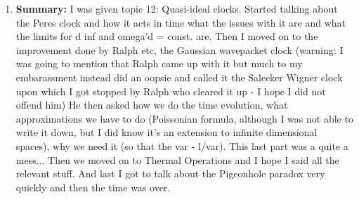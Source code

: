 \documentclass{article}%
\begin{document}
\begin{enumerate}
\item%
\begin{mycolorbox}%
\textbf{Summary:}%
\newline%
I was given topic 12: Quasi{-}ideal clocks. Started talking about the Peres clock and how it acts in time what the issues with it are and what the limits for d inf and omega'd = const. are. Then I moved on to the improvement done by Ralph etc, the Gaussian wavepacket clock (warning: I was going to mention that Ralph came up with it but much to my embarassment instead did an oopsie and called it the Salecker Wigner clock upon which I got stopped by Ralph who cleared it up {-} I hope I did not offend him)\newline%
He then asked how we do the time evolution, what approximations we have to do (Poissonian formula, although I was not able to write it down, but I did know it's an extension to infinite dimensional spaces), why we need it (so that the var {-} l/var). This last part was a quite a mess...\newline%
Then we moved on to Thermal Operations and I hope I said all the relevant stuff. And last I got to talk about the Pigeonhole paradox very quickly and then the time was over.%
\end{mycolorbox}%
\end{enumerate}%
\newpage%
\end{document}
